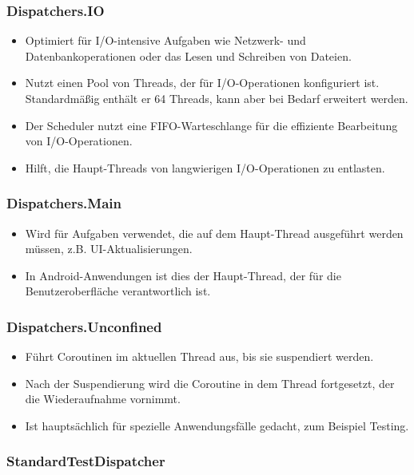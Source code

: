 \documentclass[fontsize=12pt,paper=a4,twoside=semi,parskip=half-,headsepline,headinclude]{scrreprt}
\begin{document}
\subsubsection{Dispatchers.IO}

\begin{itemize}
	\item Optimiert für I/O-intensive Aufgaben wie Netzwerk- und Datenbankoperationen oder das Lesen und Schreiben von Dateien.
	\item Nutzt einen Pool von Threads, der für I/O-Operationen konfiguriert ist.  Standardmäßig enthält er 64 Threads, kann aber bei Bedarf erweitert werden.
	\item Der Scheduler nutzt eine FIFO-Warteschlange für die effiziente Bearbeitung von I/O-Operationen.
	\item Hilft, die Haupt-Threads von langwierigen I/O-Operationen zu entlasten.
\end{itemize}

\subsubsection{Dispatchers.Main}

\begin{itemize}
	\item Wird für Aufgaben verwendet, die auf dem Haupt-Thread ausgeführt werden müssen, z.B. UI-Aktualisierungen.
	\item In Android-Anwendungen ist dies der Haupt-Thread, der für die Benutzeroberfläche verantwortlich ist.
\end{itemize}

\subsubsection{Dispatchers.Unconfined}

\begin{itemize}
	\item Führt Coroutinen im aktuellen Thread aus, bis sie suspendiert werden.
	\item Nach der Suspendierung wird die Coroutine in dem Thread fortgesetzt, der die Wiederaufnahme vornimmt.
	\item Ist hauptsächlich für spezielle Anwendungsfälle gedacht, zum Beispiel  Testing.
\end{itemize}

\subsubsection{StandardTestDispatcher}
\end{document}

